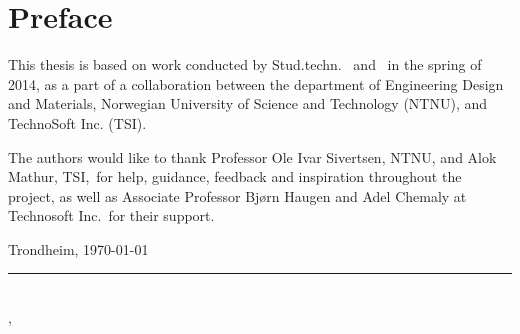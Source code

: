 \section*{\Huge Preface}
\vspace{1 cm}


\noindent This thesis is based on work conducted by Stud.techn. \myauthorA\ and \myauthorB\ in the spring of 2014, as a part of a collaboration between the department of Engineering Design and Materials, Norwegian University of Science and Technology (NTNU), and TechnoSoft Inc. (TSI).

\noindent The authors would like to thank Professor Ole Ivar Sivertsen, NTNU, and Alok Mathur, TSI,\ for help, guidance, feedback and inspiration throughout the project, as well as Associate Professor Bjørn Haugen and Adel Chemaly at Technosoft Inc.\ for their support.


Trondheim, \today


\rule{10cm}{0.5pt}\\
\indent \myauthorA, \myauthorB\

\cleardoublepage\
